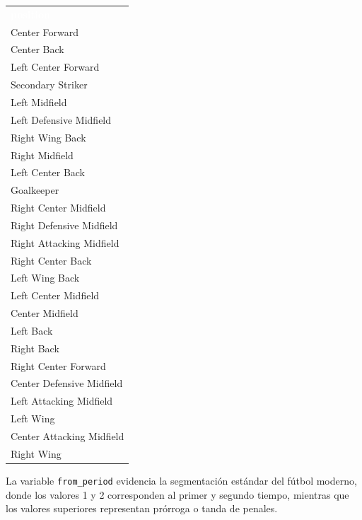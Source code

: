 \documentclass[12pt,a4paper]{article}
\newcommand{\thead}[1]{%
  \cellcolor{tableheader}\textcolor{white}{\textbf{#1}}%
}
\begin{document}
\begin{center}
\small
\begin{tabular}{l}
\rowcolor{tableheader}
\thead{position} \\

\rowcolor{tablealt} Center Forward \\
\rowcolor{tablerow} Center Back \\
\rowcolor{tablealt} Left Center Forward \\
\rowcolor{tablerow} Secondary Striker \\
\rowcolor{tablealt} Left Midfield \\
\rowcolor{tablerow} Left Defensive Midfield \\
\rowcolor{tablealt} Right Wing Back \\
\rowcolor{tablerow} Right Midfield \\
\rowcolor{tablealt} Left Center Back \\
\rowcolor{tablerow} Goalkeeper \\
\rowcolor{tablealt} Right Center Midfield \\
\rowcolor{tablerow} Right Defensive Midfield \\
\rowcolor{tablealt} Right Attacking Midfield \\
\rowcolor{tablerow} Right Center Back \\
\rowcolor{tablealt} Left Wing Back \\
\rowcolor{tablerow} Left Center Midfield \\
\rowcolor{tablealt} Center Midfield \\
\rowcolor{tablerow} Left Back \\
\rowcolor{tablealt} Right Back \\
\rowcolor{tablerow} Right Center Forward \\
\rowcolor{tablealt} Center Defensive Midfield \\
\rowcolor{tablerow} Left Attacking Midfield \\
\rowcolor{tablealt} Left Wing \\
\rowcolor{tablerow} Center Attacking Midfield \\
\rowcolor{tablealt} Right Wing \\

\end{tabular}
\end{center}

La variable \texttt{from\_period} evidencia la segmentación estándar del fútbol moderno, donde los valores 1 y 2 corresponden al primer y segundo tiempo, mientras que los valores superiores representan prórroga o tanda de penales.
\end{document}
